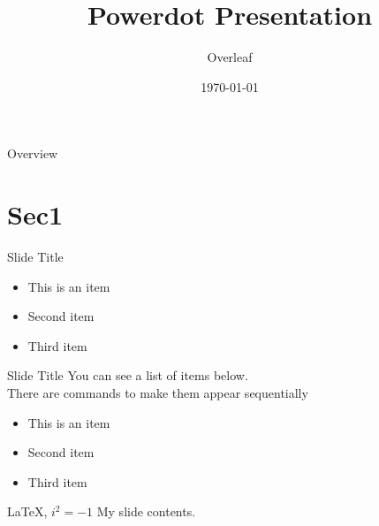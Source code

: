 \documentclass[paper=a4paper,style=fyma]{powerdot}
\title{Powerdot Presentation}
\author{Overleaf}
\date{\today}
\begin{document}
\maketitle

\begin{slide}[toc=,bm=]{Overview}
	\tableofcontents[content=sections]
\end{slide}

\section{Sec1}
\begin{slide}{Slide Title}
  \begin{itemize}
  \item This is an item
  \item Second item
  \item Third item
  \end{itemize}
\end{slide}


\begin{slide}{Slide Title}
	You can see a list of items below. \pause \\
	There are commands to make them appear sequentially
	\begin{itemize}[type=1]
		\item<2-3> This is an item
		\item<3> Second item
		\item<4> Third item
	\end{itemize}
\end{slide}

\begin{slide}[toc=,bm={LaTeX, i*i=-1}]{\color{red}\LaTeX, $i^2=-1$}
	My slide contents.
\end{slide}
\end{document}
